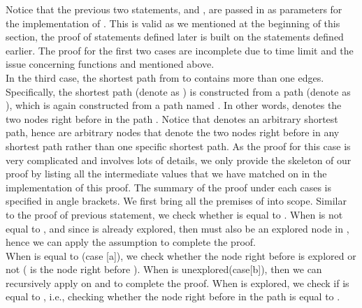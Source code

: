 Notice that the previous two statements,  and , are passed in as parameters for the implementation of . This is valid as we mentioned at the beginning of this section, the proof of statements defined later is built on the statements defined earlier. The proof for the first two cases are incomplete due to time limit and the issue concerning functions  and  mentioned above. 
\\

In the third case, the shortest path from  to  contains more than one edges. Specifically, the shortest  path (denote as ) is constructed from a  path (denote as ), which is again constructed from a  path named . In other words,  denotes the two nodes right before  in the path . Notice that  denotes an arbitrary shortest  path, hence  are arbitrary nodes that denote the two nodes right before  in any shortest  path rather than one specific shortest path. As the proof for this case is very complicated and involves lots of details, we only provide the skeleton of our proof by listing all the intermediate values that we have matched on in the implementation of this proof. The summary of the proof under each cases is specified in angle brackets. We first bring all the premises of  into scope. Similar to the proof of previous statement, we check whether  is equal to . When  is not equal to , and since  is already explored, then  must also be an explored node in , hence we can apply the  assumption to complete the proof. 
\\

When  is equal to (case [a]), we check whether the node  right before  is explored or not ( is the node right before ). When  is unexplored(case[b]), then we can recursively apply  on  and  to complete the proof. When  is explored, we check if  is equal to , i.e., checking whether the node right before  in the path  is equal to . 
\\

